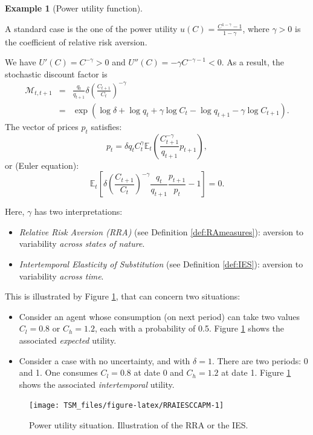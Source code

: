 \documentclass[
  12pt,
]{book}
\providecommand{\tightlist}{%
  \setlength{\itemsep}{0pt}\setlength{\parskip}{0pt}}
\theoremstyle{definition}
\theoremstyle{definition}
\newtheorem{example}{Example}[chapter]
\theoremstyle{definition}
\theoremstyle{definition}
\theoremstyle{remark}
\begin{document}
\begin{example}[Power utility function]
\protect\hypertarget{exm:CCAPM}{}\label{exm:CCAPM}

A standard case is the one of the power utility \(u(C) = \frac{C^{1-\gamma}-1}{1-\gamma}\), where \(\gamma>0\) is the coefficient of relative risk aversion.

We have \(U'(C) = C^{-\gamma} > 0\) and \(U''(C) = - \gamma C^{-\gamma-1} < 0\). As a result, the stochastic discount factor is
\begin{eqnarray}
\mathcal{M}_{t,t+1} &=&  \frac{q_t}{q_{t+1}} \delta \left(
\frac{C_{t+1}}{C_t} \right)^{-\gamma} \nonumber\\
&=& \exp(\log
\delta + \log q_t + \gamma \log  C_t - \log  q_{t+1} - \gamma
\log  C_{t+1}).\label{eq:powerutilSDF}
\end{eqnarray}
The vector of prices \(p_t\) satisfies:
\[
p_t = \delta q_t C^\gamma_t \mathbb{E}_t \left(
\frac{C^{-\gamma}_{t+1}}{q_{t+1}} p_{t+1}
\right),
\]
or (Euler equation):
\[
\mathbb{E}_t\left[
\delta\left(
\frac{C_{t+1}}{C_t}
\right)^{-\gamma}  \frac{q_t}{q_{t+1}}
\frac{p_{t+1}}{p_t} - 1
\right] = 0.
\]

Here, \(\gamma\) has two interpretations:

\begin{itemize}
\tightlist
\item
  \emph{Relative Risk Aversion (RRA)} (see Definition \ref{def:RAmeasures}): aversion to variability \emph{across states of nature}.
\item
  \emph{Intertemporal Elasticity of Substitution} (see Definition \ref{def:IES}): aversion to variability \emph{across time}.
\end{itemize}

This is illustrated by Figure \ref{fig:RRAIESCCAPM}, that can concern two situations:

\begin{itemize}
\tightlist
\item
  Consider an agent whose consumption (on next period) can take two values \(C_l= 0.8\) or \(C_h= 1.2\), each with a probability of 0.5. Figure \ref{fig:RRAIESCCAPM} shows the associated \emph{expected} utility.
\item
  Consider a case with no uncertainty, and with \(\delta=1\). There are two periods: 0 and 1. One consumes \(C_l=0.8\) at date 0 and \(C_h=1.2\) at date 1. Figure \ref{fig:RRAIESCCAPM} shows the associated \emph{intertemporal} utility.
\end{itemize}

\begin{figure}
\texttt{[image: TSM\_files/figure-latex/RRAIESCCAPM-1]} \caption{Power utility situation. Illustration of the RRA or the IES.}\label{fig:RRAIESCCAPM}
\end{figure}

\end{example}
\end{document}
